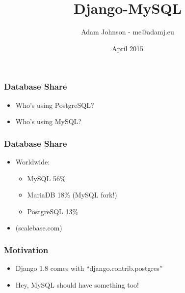 \documentclass{beamer}
\title{Django-MySQL}
\author{Adam Johnson - me@adamj.eu}
\date{April 2015}
\begin{document}
\maketitle


\begin{frame}[fragile]\frametitle{Database Share}

    \begin{itemize}
        \item Who's using PostgreSQL?
        \item Who's using MySQL?
    \end{itemize}

\end{frame}


\begin{frame}[fragile]\frametitle{Database Share}

    \begin{itemize}
        \item Worldwide:
        \begin{itemize}
            \item MySQL 56\%
            \item MariaDB 18\% (MySQL fork!)
            \item PostgreSQL 13\%
        \end{itemize}
        \item (scalebase.com)
    \end{itemize}

\end{frame}


\begin{frame}[fragile]\frametitle{Motivation}

    \begin{itemize}
        \item Django 1.8 comes with ``django.contrib.postgres''
        \item Hey, MySQL should have something too!
    \end{itemize}

\end{frame}
\end{document}
